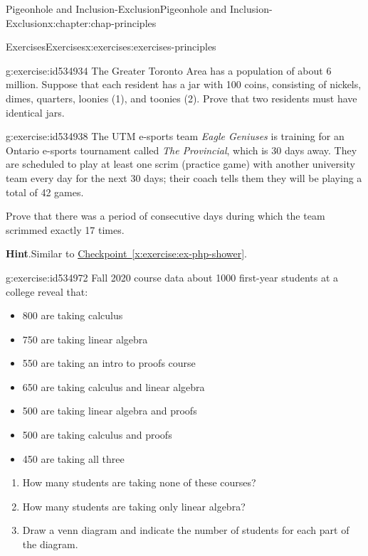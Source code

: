 \documentclass[oneside,10pt,]{book}
\newcommand{\blocktitlefont}{\relax}
\newcommand{\xreffont}{\relax}
\numberwithin{equation}{section}
\begin{document}
\begin{chapterptx}{Pigeonhole and Inclusion-Exclusion}{}{Pigeonhole and Inclusion-Exclusion}{}{}{x:chapter:chap-principles}
\begin{exercises-section}{Exercises}{}{Exercises}{}{}{x:exercises:exercises-principles}
\begin{divisionexercise}{10}{}{}{g:exercise:id534934}%
The Greater Toronto Area has a population of about 6 million. Suppose that each resident has a jar with 100 coins, consisting of nickels, dimes, quarters, loonies (\textdollar{}1), and toonies (\textdollar{}2). Prove that two residents must have identical jars.%
\end{divisionexercise}%
\begin{divisionexercise}{11}{}{}{g:exercise:id534938}%
The UTM e-sports team \emph{Eagle Geniuses} is training for an Ontario e-sports tournament called \emph{The Provincial}, which is 30 days away. They are scheduled to play at least one scrim (practice game) with another university team every day for the next 30 days; their coach tells them they will be playing a total of 42 games.%
\par
Prove that there was a period of consecutive days during which the team scrimmed exactly 17 times.%
\par\smallskip%
\noindent\textbf{\blocktitlefont Hint}.\hypertarget{g:hint:id534982}{}\quad{}Similar to \hyperref[x:exercise:ex-php-shower]{Checkpoint~{\xreffont\ref{x:exercise:ex-php-shower}}}.%
\end{divisionexercise}%
\begin{divisionexercise}{12}{}{}{g:exercise:id534972}%
Fall 2020 course data about 1000 first-year students at a college reveal that:%
\begin{itemize}[label=\textbullet]
\item{}800 are taking calculus%
\item{}750 are taking linear algebra%
\item{}550 are taking an intro to proofs course%
\item{}650 are taking calculus and linear algebra%
\item{}500 are taking linear algebra and proofs%
\item{}500 are taking calculus and proofs%
\item{}450 are taking all three%
\end{itemize}
%
\begin{enumerate}[label=(\alph*)]
\item{}How many students are taking none of these courses?%
\item{}How many students are taking only linear algebra?%
\item{}Draw a venn diagram and indicate the number of students for each part of the diagram.%
\end{enumerate}

\end{divisionexercise}
\end{exercises-section}
\end{chapterptx}
\end{document}
